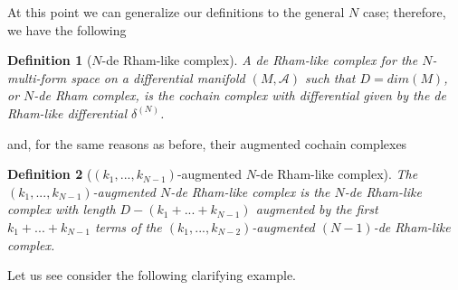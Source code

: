 \documentclass[a4paper,12pt]{article}
\newtheorem{Definition}{Definition}[section]
\begin{document}
At this point we can generalize our definitions to the general $N$ case; therefore, we have the following
\begin{Definition}[$N$-de Rham-like complex]
    A de Rham-like complex for the $N$-multi-form space on a differential manifold $(M,\mathcal{A})$ such that $D=dim(M)$, or $N$-de Rham complex, is the cochain complex with differential given by the de Rham-like differential $\delta^{( N)}$.
\end{Definition}
and, for the same reasons as before, their augmented cochain complexes
\begin{Definition}[$(k_1,...,k_{N-1})$-augmented $N$-de Rham-like complex]\label{Naugcomp}
The $(k_1,...,k_{N-1})$-augmented $N$-de Rham-like complex is the $N$-de Rham-like complex with length $D-(k_1+...+k_{N-1})$ augmented by the first $k_1+...+k_{N-1}$ terms of the $(k_1,...,k_{N-2})$-augmented $(N-1)$-de Rham-like complex.
\end{Definition}
Let us see consider the following clarifying example.
\end{document}
